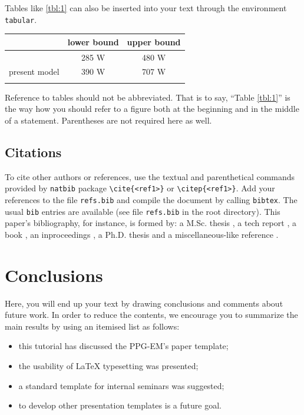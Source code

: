 \documentclass[date]{ppgem}
\begin{document}
\begin{multicols}{2}
Tables like \ref{tbl:1} can also be inserted into your text through the environment \verb|tabular|.
\begin{center}
  \begin{tabular}{ccc}
    \hline
    & lower bound & upper bound\\
    \hline
    \citet{ambrosini2004} & 285 W & 480 W\\
    present model & 390 W & 707 W\\
    \hline\\
  \end{tabular}
  \label{tbl:1}
\end{center}
Reference to tables should not be abbreviated. That is to say, ``Table \ref{tbl:1}'' is the way how you should refer to a figure both at the beginning and in the middle of a statement. Parentheses are not required here as well.
\subsection{Citations}

To cite other authors or references, use the textual and parenthetical commands provided by \verb|natbib| package 
\verb|\cite{<ref1>}| or \verb|\citep{<ref1>}|. Add your references to the file \verb|refs.bib| and compile the document by calling \verb|bibtex|.
The usual \verb|bib| entries are available (see file \verb|refs.bib| in the root directory). This paper's bibliography, for instance, is formed by: a M.Sc. thesis \citep{rabellomsc2007}, a tech report \cite{amarante2001}, a book \citep{batchelor1994}, an inproceedings \cite{lima2009}, a Ph.D. thesis \citep{loureirophd2008} and a miscellaneous-like reference \citep{mangiavacchi2000}.

\section{Conclusions}

Here, you will end up your text by drawing conclusions and comments about future work. In order to reduce the contents, we encourage you to summarize the main results by using an itemised list as follows:
\begin{itemize}
\item this tutorial has discussed the PPG-EM's paper template;
\item the usability of {\LaTeX} typesetting was presented;
\item a standard template for internal seminars was suggested;
\item to develop other presentation templates is a future goal. 
\end{itemize}


\end{multicols}
\end{document}
